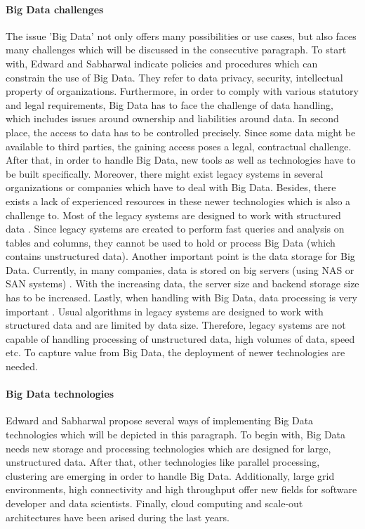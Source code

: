 \paragraph{Big Data challenges}

The issue 'Big Data' not only offers many possibilities or use cases, but also faces many challenges \cite[p.11 ff.]{mongodb_edward} which will be discussed in the consecutive paragraph. To start with, Edward and Sabharwal indicate policies and procedures which can constrain the use of Big Data. They refer to data privacy, security, intellectual property of organizations. Furthermore, in order to comply with various statutory and legal requirements, Big Data has to face the challenge of data handling, which includes issues around ownership and liabilities around data. In second place, the access to data has to be controlled precisely. Since some data might be available to third parties, the gaining access poses a legal, contractual challenge. After that, in order to handle Big Data, new tools as well as technologies have to be built specifically. Moreover, there might exist legacy systems in several organizations or companies which have to deal with Big Data. Besides, there exists a lack of experienced resources in these newer technologies which is also a challenge to.
Most of the legacy systems are designed to work with structured data \cite[p.11 ff.]{mongodb_edward}. Since legacy systems are created to perform fast queries and analysis on tables and columns, they cannot be used to hold or process Big Data (which contains unstructured data). Another important point is the data storage for Big Data. Currently, in many companies, data is stored on big servers (using \ac{NAS} or \ac{SAN} systems) \cite[p.11 ff.]{mongodb_edward}. With the increasing data, the server size and backend storage size has to be increased. 
Lastly, when handling with Big Data, data processing is very important . Usual algorithms in legacy systems are designed to work with structured data and are limited by data size. Therefore, legacy systems are not capable of handling processing of unstructured data, high volumes of data, speed etc. To capture value from Big Data, the deployment of newer technologies are needed. 

\paragraph{Big Data technologies}

Edward and Sabharwal propose several ways of implementing Big Data technologies \cite[p.12 ff.]{mongodb_edward} which will be depicted in this paragraph. To begin with, Big Data needs new storage and processing technologies which are designed for large, unstructured data. After that, other technologies like parallel processing, clustering are emerging in order to handle Big Data. Additionally, large grid environments, high connectivity and high throughput offer new fields for software developer and data scientists. Finally, cloud computing and scale-out architectures have been arised during the last years.

